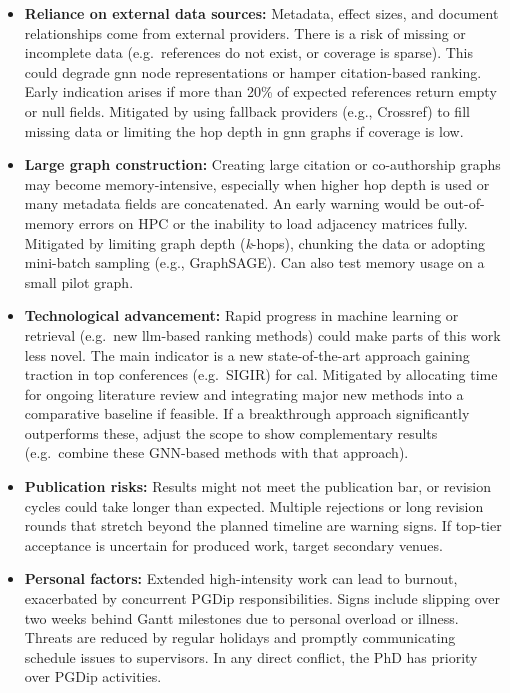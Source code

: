 \documentclass[10pt,oneside]{book}
\begin{document}
\begin{itemize}
    \item \textbf{Reliance on external data sources:}
    Metadata, effect sizes, and document relationships come from external providers. There is a risk of missing or incomplete data (e.g.\ references do not exist, or coverage is sparse). This could degrade \gls*{gnn} node representations or hamper citation-based ranking. Early indication arises if more than 20\% of expected references return empty or null fields. Mitigated by using fallback providers (e.g., Crossref) to fill missing data or limiting the hop depth in \gls*{gnn} graphs if coverage is low.
    
    \item \textbf{Large graph construction:}
    Creating large citation or co-authorship graphs may become memory-intensive, especially when higher hop depth is used or many metadata fields are concatenated. An early warning would be out-of-memory errors on HPC or the inability to load adjacency matrices fully. Mitigated by limiting graph depth (\emph{k}-hops), chunking the data or adopting mini-batch sampling (e.g., GraphSAGE). Can also test memory usage on a small pilot graph.

    \item \textbf{Technological advancement:}
    Rapid progress in machine learning or retrieval (e.g.\ new \gls*{llm}-based ranking methods) could make parts of this work less novel. The main indicator is a new state-of-the-art approach gaining traction in top conferences (e.g.\ SIGIR) for \gls*{cal}. Mitigated by allocating time for ongoing literature review and integrating major new methods into a comparative baseline if feasible. If a breakthrough approach significantly outperforms these, adjust the scope to show complementary results (e.g.\ combine these GNN-based methods with that approach).

    \item \textbf{Publication risks:}
    Results might not meet the publication bar, or revision cycles could take longer than expected. Multiple rejections or long revision rounds that stretch beyond the planned timeline are warning signs. If top-tier acceptance is uncertain for produced work, target secondary venues. 

    \item \textbf{Personal factors:}
    Extended high-intensity work can lead to burnout, exacerbated by concurrent PGDip responsibilities. Signs include slipping over two weeks behind Gantt milestones due to personal overload or illness. Threats are reduced by regular holidays and promptly communicating schedule issues to supervisors. In any direct conflict, the PhD has priority over PGDip activities.
\end{itemize}
\end{document}
